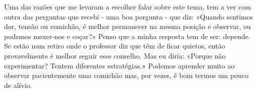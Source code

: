 Uma das razões que me levaram a escolher falar sobre este tema, tem a
ver com outra das perguntas que recebi - uma boa pergunta - que diz:
«Quando sentimos dor, tensão ou comichão, é melhor permanecer na mesma
posição e observar, ou podemos mexer-nos e coçar?» Penso que a minha
resposta tem de ser: depende. Se estão num retiro onde o professor diz
que têm de ficar quietos, então provavelmente é melhor seguir esse
conselho. Mas eu diria: «Porque não experimentar? Tentem diferentes
estratégias.» Podemos aprender muito ao observar pacientemente uma
comichão mas, por vezes, é bom termos um pouco de alívio.

